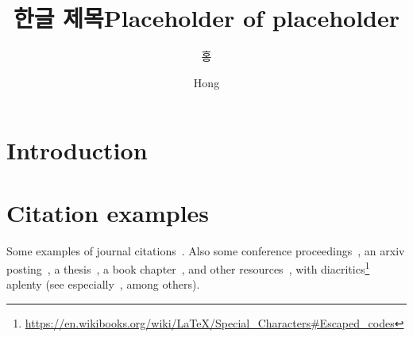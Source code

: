 \documentclass[doctor,english,final]{postech-ucs}
\title[korean]{한글 제목}
\title[english]{Placeholder of placeholder}
\author[korean]{홍}{길 동}
\author[english]{Hong}{Gil Dong}
\begin{document}

    \begin{abstract}
        \lipsum[1]
    \end{abstract}

    \tableofcontents


    \listoffigures



\chapter{Introduction}
\lipsum

\chapter{Citation examples}
Some examples of journal citations~\cite{Moin1998,PhysRevD.93.124052,pimentel-etal-2020-phonotactic,jaker_kiparsky_2020,726791,Erdos1960}.  Also some conference proceedings~\cite{Erdos60onthe,NIPS1989_53c3bce6,10.5555/2969239.2969312}, an arxiv posting~\cite{li_comparing_2009}, a thesis~\cite{Gell-Mann:1951xrt}, a book chapter~\cite{LeCun2012}, and other resources~\cite{gage1994bpe}, with diacritics\footnote{\url{https://en.wikibooks.org/wiki/LaTeX/Special_Characters\#Escaped_codes}} aplenty (see especially~\cite{jaker_kiparsky_2020,726791,Erdos1960}, among others).

\begin{summarykorean}
\jiwon
\end{summarykorean}





\end{document}
